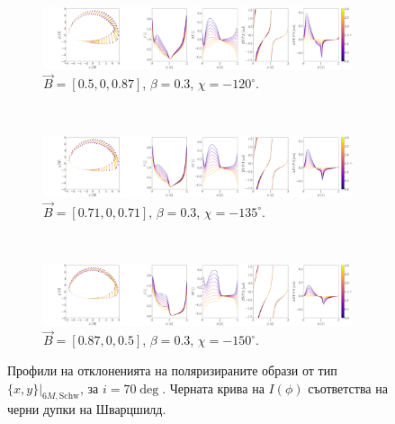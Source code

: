 \begin{figure}[!htb]
	\centering
	\begin{subfigure}{12cm}
		\hspace{-2cm}
		\includegraphics[scale = 0.15]{WH_delta_fig_B_0.5_0.87_0_70_deg_r6.png}
		\caption{$\vec{B} = [0.5, 0, 0.87]$, $\beta = 0.3$, $\chi = -120^\circ$.} 
	\end{subfigure}\\
	\begin{subfigure}{12cm}
		\hspace{-2cm}
		\includegraphics[scale = 0.15]{WH_delta_fig_B_0.71_0.71_0_70_deg_r6.png}
		\caption{$\vec{B} = [0.71, 0, 0.71]$, $\beta = 0.3$, $\chi = -135^\circ$.}
	\end{subfigure}\\
	\begin{subfigure}{12cm}
		\hspace{-2cm}
		\includegraphics[scale = 0.15]{WH_delta_fig_B_0.87_0.5_0_70_deg_r6.png}
		\caption{$\vec{B} = [0.87, 0, 0.5]$, $\beta = 0.3$, $\chi = -150^\circ$.}
	\end{subfigure}
	\caption[Профили на отклоненията на поляризираните образи oт тип $\{x,y\}\vert_{6M, \text{Schw}}$, за $i = 70\deg$.]{\small Профили на отклоненията на поляризираните образи от тип $\{x,y\}\vert_{6M, \text{Schw}}$, за $i = 70\deg$. Черната крива на $I(\phi)$ съответства на черни дупки на Шварцшилд.} 
	\label{WH_delta_r6_70_deg}
\end{figure}

